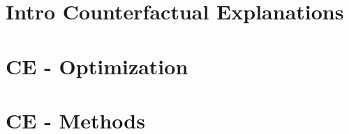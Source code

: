 \documentclass[11pt,compress,t,n
otes=noshow, aspectratio=169, xcolor=table]{beamer}
\begin{document}



% 
% 
% 

\section{Intro Counterfactual Explanations}


\section{CE - Optimization}


\section{CE - Methods}

\end{document}
